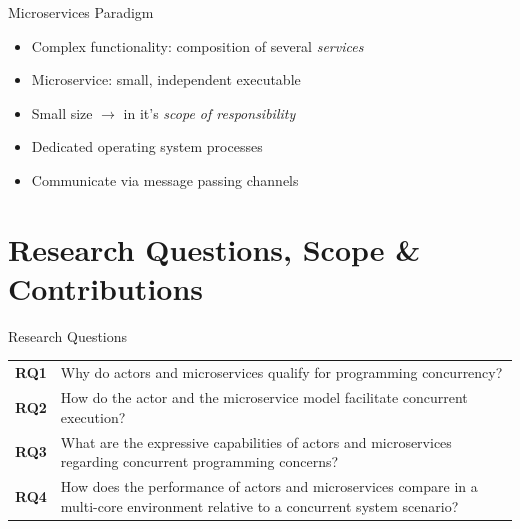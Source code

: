 \documentclass{beamer}
\begin{document}
\begin{frame}{Microservices Paradigm}

\begin{itemize}
  \item Complex functionality: composition of several \textit{services}
  \item Microservice: small, independent executable
  \item \glqq Small\grqq{} size $\rightarrow$ in it's \textit{scope of responsibility}
  \item Dedicated operating system processes
  \item Communicate via message passing channels
\end{itemize}

\end{frame}


\section{Research Questions, Scope \& Contributions}


\begin{frame}{Research Questions}

\begin{table}
  \begin{tabularx}{\textwidth}{lX}                                                                                                                    \\[10pt]%
    \textbf{RQ1} & Why do actors and microservices qualify for programming concurrency?                                                               \\[10pt]%
    \textbf{RQ2} & How do the actor and the microservice model facilitate concurrent execution?                                                       \\[10pt]%
    \textbf{RQ3} & What are the expressive capabilities of actors and microservices regarding concurrent programming concerns?                        \\[10pt]%
    \textbf{RQ4} & How does the performance of actors and microservices compare in a multi-core environment relative to a concurrent system scenario?
  \end{tabularx}
\end{table}

\end{frame}
\end{document}
